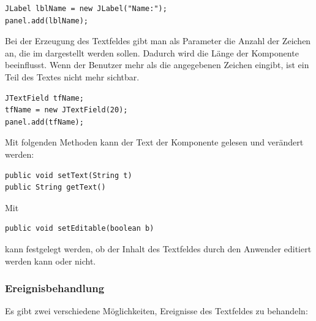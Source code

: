 \begin{lstlisting}
JLabel lblName = new JLabel("Name:");
panel.add(lblName);
\end{lstlisting}

Bei der Erzeugung des Textfeldes gibt man als Parameter die Anzahl der Zeichen
an, die im  dargestellt werden sollen. Dadurch wird die
Länge der Komponente beeinflusst. Wenn der Benutzer mehr als die angegebenen
Zeichen eingibt, ist ein Teil des Textes nicht mehr sichtbar.

\begin{lstlisting}
JTextField tfName;
tfName = new JTextField(20);
panel.add(tfName);
\end{lstlisting}

Mit folgenden Methoden kann der Text der Komponente gelesen und verändert werden:

\begin{lstlisting}
public void setText(String t)
public String getText()
\end{lstlisting}

Mit

\begin{lstlisting}
public void setEditable(boolean b)
\end{lstlisting}

kann festgelegt werden, ob der Inhalt des Textfeldes durch den Anwender
editiert werden kann oder nicht.

\subsubsection{Ereignisbehandlung}

Es gibt zwei verschiedene Möglichkeiten, Ereignisse des Textfeldes zu
behandeln:

